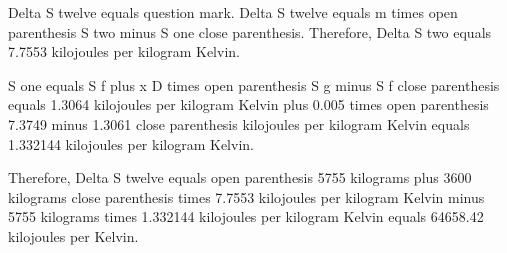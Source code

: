 Delta S twelve equals question mark.  
Delta S twelve equals m times open parenthesis S two minus S one close parenthesis. Therefore, Delta S two equals 7.7553 kilojoules per kilogram Kelvin.  

S one equals S f plus x D times open parenthesis S g minus S f close parenthesis equals 1.3064 kilojoules per kilogram Kelvin plus 0.005 times open parenthesis 7.3749 minus 1.3061 close parenthesis kilojoules per kilogram Kelvin equals 1.332144 kilojoules per kilogram Kelvin.  

Therefore, Delta S twelve equals open parenthesis 5755 kilograms plus 3600 kilograms close parenthesis times 7.7553 kilojoules per kilogram Kelvin minus 5755 kilograms times 1.332144 kilojoules per kilogram Kelvin equals 64658.42 kilojoules per Kelvin.
